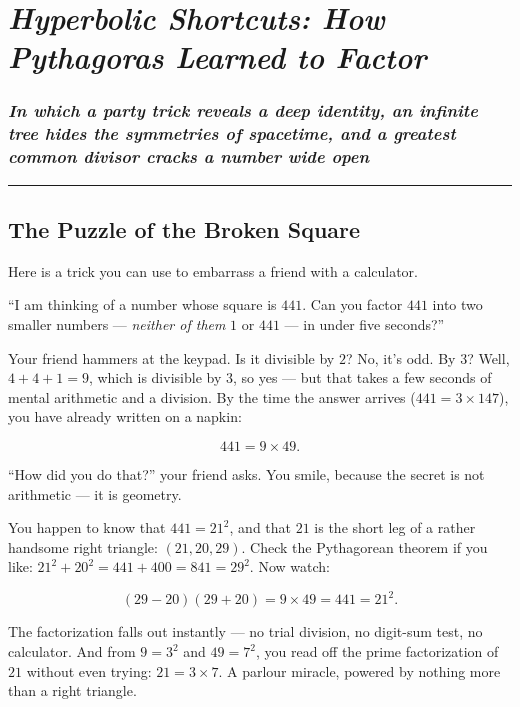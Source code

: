 \chapter{\texorpdfstring{\emph{Hyperbolic Shortcuts: How Pythagoras Learned to Factor}}{Hyperbolic Shortcuts: How Pythagoras Learned to Factor}}
\subsection{\texorpdfstring{\emph{In which a party trick reveals a deep identity, an infinite tree hides the symmetries of spacetime, and a greatest common divisor cracks a number wide open}}{In which a party trick reveals a deep identity, an infinite tree hides the symmetries of spacetime, and a greatest common divisor cracks a number wide open}}
\bigskip\noindent\rule{\linewidth}{0.4pt}\bigskip

\section{The Puzzle of the Broken Square}
Here is a trick you can use to embarrass a friend with a calculator.

``I am thinking of a number whose square is \(441\). Can you factor \(441\) into two smaller numbers --- \emph{neither of them} \(1\) or \(441\) --- in under five seconds?''

Your friend hammers at the keypad. Is it divisible by \(2\)? No, it's odd. By \(3\)? Well, \(4 + 4 + 1 = 9\), which is divisible by \(3\), so yes --- but that takes a few seconds of mental arithmetic and a division. By the time the answer arrives (\(441 = 3 \times 147\)), you have already written on a napkin:

\[441 = 9 \times 49.\]

``How did you do that?'' your friend asks. You smile, because the secret is not arithmetic --- it is geometry.

You happen to know that \(441 = 21^2\), and that \(21\) is the short leg of a rather handsome right triangle: \((21, 20, 29)\). Check the Pythagorean theorem if you like: \(21^2 + 20^2 = 441 + 400 = 841 = 29^2\). Now watch:

\[(29 - 20)(29 + 20) = 9 \times 49 = 441 = 21^2.\]

The factorization falls out instantly --- no trial division, no digit-sum test, no calculator. And from \(9 = 3^2\) and \(49 = 7^2\), you read off the prime factorization of \(21\) without even trying: \(21 = 3 \times 7\). A parlour miracle, powered by nothing more than a right triangle.


